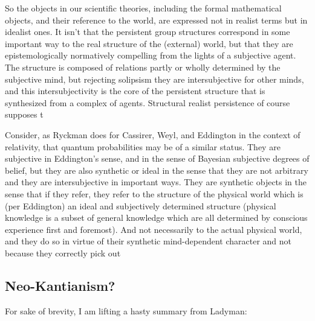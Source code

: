 So the objects in our scientific theories, including the formal mathematical objects, and their reference to the world, are expressed not in realist terms but in idealist ones.  It isn't that the persistent group structures correspond in some important way to the real structure of the (external) world, but that they are epistemologically normatively compelling from the lights of a subjective agent.  The structure is composed of relations partly or wholly determined by the subjective mind, but rejecting solipsism they are intersubjective for other minds, and this intersubjectivity is the core of the persistent structure that is synthesized from a complex of agents.  Structural realist persistence of course supposes t



Consider, as Ryckman does for Cassirer, Weyl, and Eddington in the context of relativity, that quantum probabilities may be of a similar status.  They are subjective in Eddington's sense, and in the sense of Bayesian subjective degrees of belief, but they are also synthetic or ideal in the sense that they are not arbitrary and they are intersubjective in important ways.  They are synthetic objects in the sense that if they refer, they refer to the structure of the physical world which is (per Eddington) an ideal and subjectively determined structure (physical knowledge is a subset of general knowledge which are all determined by conscious experience first and foremost).  And not necessarily to the actual physical world, and they do so in virtue of their synthetic mind-dependent character and not because they correctly pick out 





\subsection{Neo-Kantianism?}

For sake of brevity, I am lifting a hasty summary from Ladyman:



